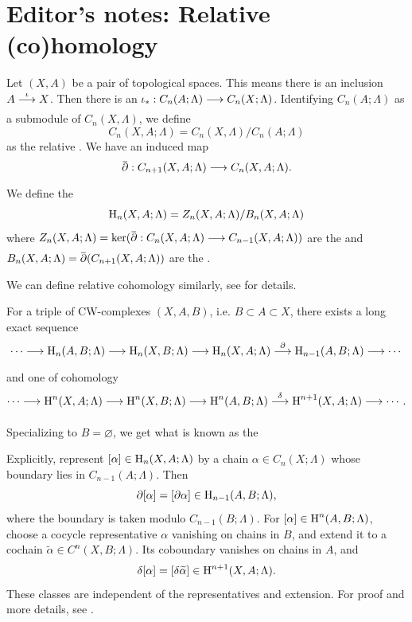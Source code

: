 \documentclass[../main]{subfiles}
\begin{document}
\section{Editor's notes: Relative (co)homology}

\begin{definition}
Let $(X,A)$ be a pair of topological spaces. This means there is an inclusion $A\varrightarrow{\iota} X$. Then there is an  $\iota_\ast:C_n(A;\Lambda) \varrightarrow{} C_n(X;\Lambda)$. Identifying $C_n(A;\Lambda)$ as a submodule of $C_n(X,\Lambda)$, we define 
\[C_n(X,A;\Lambda) = C_n(X,\Lambda)/C_n(A;\Lambda) \]
as the relative . We have an induced map
\[\xoverline{\partial}:C_{n+1}(X,A;\Lambda)\varrightarrow{}C_n(X,A;\Lambda). \]
We define the 
\[\operatorname{H}_n(X, A;\Lambda)=Z_n(X,A;\Lambda)/B_n(X,A;\Lambda)\]
where $Z_n(X,A;\Lambda)=\ker(\xoverline{\partial}:C_{n}(X,A;\Lambda)\varrightarrow{}C_{n-1}(X,A;\Lambda))$ are the  and $B_n(X,A;\Lambda)=\xoverline{\partial}(C_{n+1}(X,A;\Lambda))$ are the .
\end{definition}

We can define relative cohomology similarly, see \cite[p. 199]{hatcher2002algebraic} for details. 

\begin{theorem*} For a triple of CW-complexes $(X,A,B)$, i.e. $B\subset A\subset X$, there exists a long exact sequence
\[\cdots \varrightarrow{}\homology_n(A,B;\Lambda)\varrightarrow{}\homology_n(X,B;\Lambda)\varrightarrow{}\homology_n(X,A;\Lambda)\varrightarrow{\partial}\homology_{n-1}(A,B;\Lambda)\varrightarrow{}\cdots\]
and one of cohomology 
\[\cdots \varrightarrow{}\homology^n(X,A;\Lambda)\varrightarrow{}\homology^n(X,B;\Lambda)\varrightarrow{}\homology^n(A,B;\Lambda)\varrightarrow{\delta} \homology^{n+1}(X,A;\Lambda)\varrightarrow{}\cdots.\]
\end{theorem*}
Specializing to $B=\varnothing$, we get what is known as the  

Explicitly, represent $[\alpha]\in \operatorname{H}_n(X,A;\Lambda)$ by a chain $\alpha\in C_n(X;\Lambda)$ whose boundary lies in $C_{n-1}(A;\Lambda)$. Then
\[\partial[\alpha]=[\partial\alpha]\in\operatorname{H}_{n-1}(A,B;\Lambda),\]
where the boundary is taken modulo $C_{n-1}(B;\Lambda)$. For $[\alpha]\in\operatorname{H}^n(A,B;\Lambda)$, choose a cocycle representative $\alpha$ vanishing on chains in $B$, and extend it to a cochain $\widetilde\alpha\in C^n(X,B;\Lambda)$. Its coboundary vanishes on chains in $A$, and
\[\delta[\alpha]=[\delta\widetilde\alpha]\in\operatorname{H}^{n+1}(X,A;\Lambda).\]
These classes are independent of the representatives and extension. For proof and more details, see \cite[pp. 113, 199--200]{hatcher2002algebraic}.
\end{document}
